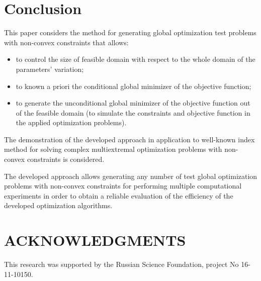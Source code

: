 \documentclass{aip-cp}
\begin{document}
\section {Conclusion}

This paper considers the method for generating global optimization test problems with non-convex constraints that allows:
\begin{itemize}
	\item to control the size of feasible domain with respect to the whole domain of the parameters' variation;
	\item to known a priori the conditional global minimizer of the objective function;
	\item to generate the unconditional global minimizer of the objective function out of the feasible domain (to simulate the constraints and objective function in the applied optimization problems).
\end{itemize}

The demonstration of the developed approach in application to well-known index method for solving complex multiextremal optimization problems with non-convex constraints is considered.

The developed approach allows generating any number of test global optimization problems with non-convex constraints for performing multiple computational experiments in order to obtain a reliable evaluation of the efficiency of the developed optimization algorithms.

\section{ACKNOWLEDGMENTS}
This research was supported by the Russian Science Foundation, project No 16-11-10150.


%
%
\end{document}
